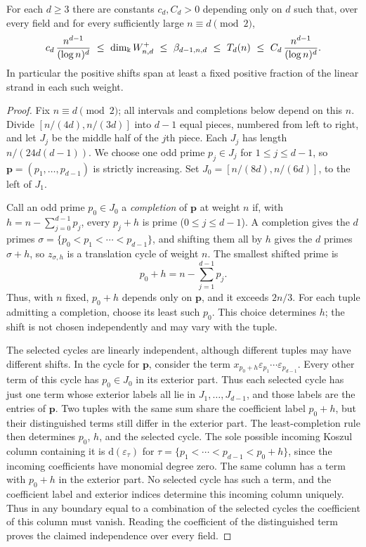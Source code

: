 \begin{theorem}
\label{thm:prime-shift-proportion}
For each $d\ge3$ there are constants $c_d,C_d>0$ depending only on $d$ such that, over every
field and for every sufficiently large $n\equiv d\pmod 2$,
\[
 c_d\,\frac{n^{d-1}}{(\log n)^d}
 \ \le\ \dim_\Bbbk W^+_{n,d}\ \le\ \beta_{d-1,n,d}
 \ \le\ T_d(n)\ \le\ C_d\,\frac{n^{d-1}}{(\log n)^d}.
\]
In particular the positive shifts span at least a fixed positive fraction
of the linear strand in each such weight.
\end{theorem}
\begin{proof}
Fix $n\equiv d\pmod 2$; all intervals and completions below depend on this $n$.
Divide $[n/(4d),n/(3d)]$ into $d-1$ equal pieces, numbered from left
to right, and let $J_j$ be the middle half of the $j$th piece. Each
$J_j$ has length $n/(24d(d-1))$. We choose one odd prime $p_j\in J_j$
for $1\le j\le d-1$, so $\boldsymbol p=(p_1,\ldots,p_{d-1})$ is
strictly increasing. Set $J_0=[n/(8d),n/(6d)]$, to the left of $J_1$.

Call an odd prime $p_0\in J_0$ a \emph{completion} of $\boldsymbol p$ at weight $n$
if, with $h=n-\sum_{j=0}^{d-1}p_j$, every $p_j+h$ is prime
($0\le j\le d-1$). A completion gives the $d$ primes
$\sigma=\{p_0<p_1<\cdots<p_{d-1}\}$, and shifting them all by $h$ gives
the $d$ primes $\sigma+h$, so $z_{\sigma,h}$ is a translation cycle of
weight $n$. The smallest shifted prime is
\[
 p_0+h=n-\sum_{j=1}^{d-1}p_j .
\]
Thus, with $n$ fixed, $p_0+h$ depends only on $\boldsymbol p$, and it exceeds $2n/3$.
For each tuple admitting a completion, choose its least such $p_0$.
This choice determines $h$; the shift is not chosen independently and
may vary with the tuple.

The selected cycles are linearly independent, although different
tuples may have different shifts.
In the cycle for $\boldsymbol p$, consider the term
$x_{p_0+h}\varepsilon_{p_1}\cdots\varepsilon_{p_{d-1}}$. Every other term
of this cycle has $p_0\in J_0$ in its exterior part. Thus each selected
cycle has just one term whose exterior labels all lie in
$J_1,\ldots,J_{d-1}$, and those labels are the entries of $\boldsymbol p$.
Two tuples with the same sum share the coefficient label $p_0+h$, but
their distinguished terms still differ in the exterior part.
The least-completion rule then determines $p_0$, $h$, and the selected cycle.
The sole possible incoming Koszul column
containing it is $\mathrm{d}(\varepsilon_\tau)$ for
$\tau=\{p_1<\cdots<p_{d-1}<p_0+h\}$, since the incoming coefficients have monomial degree zero. The same column has a term with $p_0+h$ in
the exterior part. No selected cycle has such a term, and the
coefficient label and exterior indices determine this incoming column
uniquely. Thus in any boundary equal to a combination of the selected
cycles the coefficient of this column must vanish. Reading the coefficient
of the distinguished term proves the claimed independence over every field.


\end{proof}
